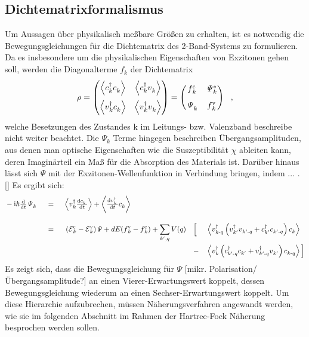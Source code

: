 \documentclass[a4paper,11pt, twoside]{article}
\newcommand{\ind}[2]{{_{#1}^{#2}}}
\newcommand{\+}{\dagger}
\newcommand{\E}{\mathcal{E}}
\newcommand{\dt}[1]{\tfrac{\tt d #1}{\tt d t}}
\newcommand{\bra}{\left \langle}
\newcommand{\ket}{\right \rangle}
\renewcommand{\^}{\hat}
\renewcommand{\tt}{\text}
\renewcommand{\~}{\widetilde}
\begin{document}
\subsection{Dichtematrixformalismus}
Um Aussagen über physikalisch meßbare Größen zu erhalten, ist es notwendig die Bewegungsgleichungen für die Dichtematrix des 2-Band-Systems zu formulieren. Da es insbesondere um die physikalischen Eigenschaften von Exzitonen gehen soll, werden die Diagonalterme $f\ind{k}{}$  der Dichtematrix
\begin{align*}
\rho 
= \begin{pmatrix}
\bra c\ind{k}{\+}c\ind{k}{} \ket & \bra c\ind{k}{\+}v\ind{k}{} \ket \\[8pt]
\bra v\ind{k}{\+}c\ind{k}{} \ket & \bra v\ind{k}{\+}v\ind{k}{}  \ket
\end{pmatrix}
=\begin{pmatrix}
f\ind{k}{\tt c}& \mathit{\Psi}\ind{k}{*}  \\[8pt]
\mathit{\Psi}\ind{k}{} & f\ind{k}{\tt v}
\end{pmatrix}\ \ ,
\end{align*}
welche Besetzungen des Zustandes k im Leitungs- bzw. Valenzband beschreibe nicht weiter beachtet. Die $\mathit{\Psi}_k$ Terme hingegen beschreiben Übergangsamplituden, aus denen man optische Eigenschaften wie die Suszeptibilität $\chi$ ableiten kann, deren Imaginärteil ein Maß für die Absorption des Materials ist. Darüber hinaus lässt sich $\mathit{\Psi}$ mit der Exzitonen-Wellenfunktion in Verbindung bringen, indem ... . []
Es ergibt sich: 
\begin{alignat*}{5}
& -\tt i\hbar \dt{}\mathit{\Psi}\ind{k}{}  && \ = \ &&  \bra  v\ind{k}{\+}\dt{c\ind{k}{}\,} \ket + \bra \dt{v\ind{k}{\+}\,}c\ind{k}{} \ket &&  &&\\[8pt]
& && \ = \ &&\ (\E \ind{k}{\tt c}-\E \ind{k}{\tt v})\mathit{\Psi}+dE(f\ind{k}{\tt v}-f\ind{k}{\tt c}) 
+ \sum_{k',q}^{} V(q)  &&\Big [ &&\bra  v\ind{k\tt -q}{\+}\left (v\ind{k'}{\+}v\ind{k'\tt -q}{}+c\ind{k'}{\+}c\ind{k'\tt-q}{}\right )c\ind{k}{} 		\ket  \\  
& && && 			   			 &&	-	   &&\bra  v\ind{k}{\+}\left (c\ind{k'\tt -q}{\+}c\ind{k'}{}+v\ind{k'\tt-q}{\+}v\ind{k'}{}\right )c\ind{k\tt -q}{}		\ket  \Big ] 	
\end{alignat*}
Es zeigt sich, dass die Bewegungsgleichung für $\mathit{\Psi}$ [mikr. Polarisation/ Übergangsamplitude?] an einen Vierer-Erwartungswert koppelt, dessen Bewegungsgleichung wiederum an einen Sechser-Erwartungswert koppelt.  Um diese Hierarchie aufzubrechen, müssen Näherungsverfahren angewandt werden, wie sie im folgenden Abschnitt im Rahmen der Hartree-Fock Näherung besprochen werden sollen. 
\end{document}
